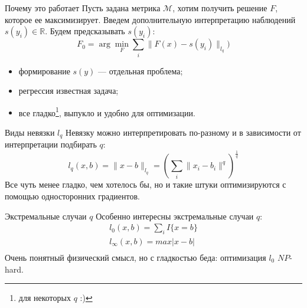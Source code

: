 \documentclass[14pt, fleqn, xcolor={dvipsnames, table}]{beamer}
\begin{document}
\begin{frame}{Почему это работает}
Пусть задана метрика $\mathcal{M}$, хотим получить решение $F$, которое ее максимизирует. Введем дополнительную интерпретацию наблюдений $s(y_i) \in \mathbb{R}$. Будем предсказывать $s(y_i)$:
$$
F_0 = \arg\min_F \sum_i \|F(x) - s(y_i)\|_{l_q})
$$
\begin{itemize}
  \item формирование $s(y)$ --- отдельная проблема;
  \item регрессия известная задача;
  \item все гладко\footnote{для некоторых $q$ :)}, выпукло и удобно для оптимизации.
\end{itemize}
\end{frame}

\begin{frame}{Виды невязки $l_q$}
Невязку можно интерпретировать по-разному и в зависимости от интерпретации подбирать $q$:
$$
l_q(x,b) = \|x - b\|_{l_q} = \left(\sum_i\|x_i - b_i\|^q\right)^\frac{1}{q}
$$
Все чуть менее гладко, чем хотелось бы, но и такие штуки оптимизируются с помощью односторонних градиентов.
\end{frame}

\begin{frame}{Экстремальные случаи $q$}
Особенно интересны экстремальные случаи $q$:
$$\begin{array}{l}
l_0(x,b) = \sum_i I\{x = b\} \\
l_{\infty}(x,b) = max |x - b| \\
\end{array}$$
Очень понятный физический смысл, но с гладкостью беда: оптимизация $l_0$ $NP$-hard.
\end{frame}
\end{document}
